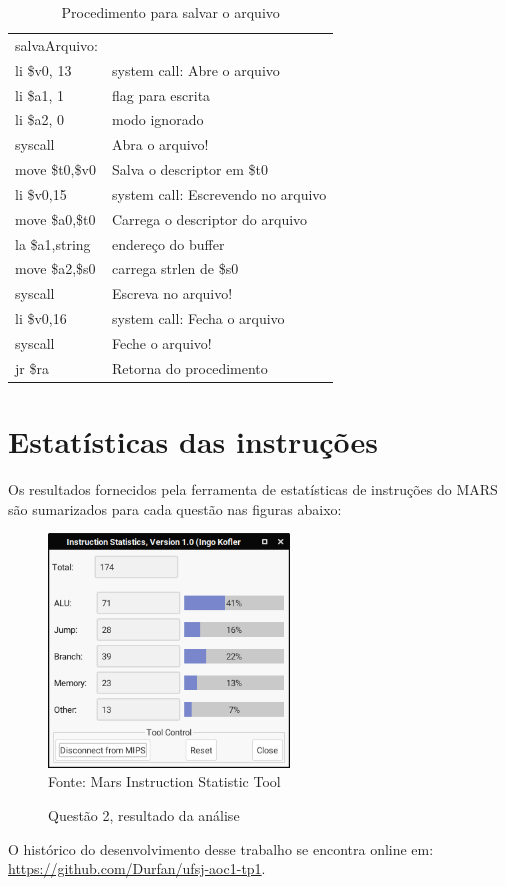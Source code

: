 \documentclass[12pt,a4paper]{article}
\numberwithin{figure}{subsection}
\numberwithin{table}{subsection}
\begin{document}
\begin{table}[H]
	\renewcommand{\arraystretch}{1}
	\centering
	\caption*{Procedimento para salvar o arquivo}
	\label{q2cod:salvafile}
	\begin{tabular}{>{\ttfamily}p{4cm} p{11cm}}
		\toprule
		salvaArquivo:    & \\
		li \$v0, 13      & system call: Abre o arquivo \\
		li \$a1, 1       & flag para escrita \\
		li \$a2, 0       & modo ignorado \\
		syscall          & Abra o arquivo! \\
		move \$t0,\$v0   & Salva o descriptor em \$t0 \\
		\midrule[0.01cm]
		li \$v0,15       & system call: Escrevendo no arquivo \\
		move \$a0,\$t0   & Carrega o descriptor do arquivo \\
		la \$a1,string   & endereço do buffer \\
		move \$a2,\$s0   & carrega strlen de \$s0 \\
		syscall          & Escreva no arquivo! \\
		\midrule[0.01cm]
		li \$v0,16       & system call: Fecha o arquivo \\
		syscall          & Feche o arquivo! \\
		jr \$ra          & Retorna do procedimento \\
		\bottomrule
	\end{tabular}
\end{table}

\pagebreak

\section{Estatísticas das instruções}

Os resultados fornecidos pela ferramenta de estatísticas de instruções do MARS são sumarizados para cada questão nas figuras abaixo:  

\begin{figure}[H]
	\centering
	\caption*{Questão 2, resultado da análise}
	\vspace{0.2cm}
	\includegraphics[width=242px]{questao2_stats}
	\\\footnotesize Fonte: Mars Instruction Statistic Tool
\end{figure}

\pagebreak

\begin{flushleft}
	\nocite{*}
	
	\vfill
	O histórico do desenvolvimento desse trabalho se encontra online em:\\ \url{https://github.com/Durfan/ufsj-aoc1-tp1}.
\end{flushleft}
\end{document}
